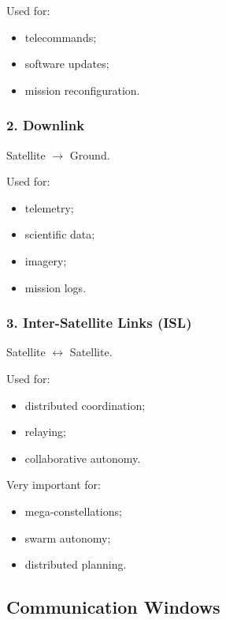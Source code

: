 \documentclass[10pt,a4paper,twocolumn]{article}
\begin{document}
Used for:
\begin{itemize}
    \item telecommands;
    \item software updates;
    \item mission reconfiguration.
\end{itemize}


\subsubsection*{2. Downlink}

Satellite
$\rightarrow$
Ground.

Used for:
\begin{itemize}
    \item telemetry;
    \item scientific data;
    \item imagery;
    \item mission logs.
\end{itemize}


\subsubsection*{3. Inter-Satellite Links (ISL)}

Satellite
$\leftrightarrow$
Satellite.

Used for:
\begin{itemize}
    \item distributed coordination;
    \item relaying;
    \item collaborative autonomy.
\end{itemize}

Very important for:
\begin{itemize}
    \item mega-constellations;
    \item swarm autonomy;
    \item distributed planning.
\end{itemize}


\subsection{Communication Windows}
\end{document}
